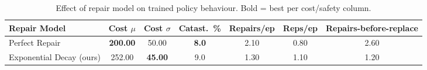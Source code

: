 \begin{table}[t]
\centering
\caption{Effect of repair model on trained policy behaviour.
Bold = best per cost/safety column.}
\label{tab:repair_ablation}
\setlength{\tabcolsep}{4pt}
\begin{tabular}{lSSSSSS}
\toprule
Repair Model & {Cost $\mu$} & {Cost $\sigma$} & {Catast.~\%} & {Repairs/ep} & {Reps/ep} & {Repairs-before-replace} \\
\midrule
Perfect Repair & \textbf{200.00} & 50.00 & \textbf{8.0} & 2.10 & 0.80 & 2.60 \\
Exponential Decay (ours) & 252.00 & \textbf{45.00} & 9.0 & 1.30 & 1.10 & 1.20 \\
\bottomrule
\end{tabular}
\end{table}
